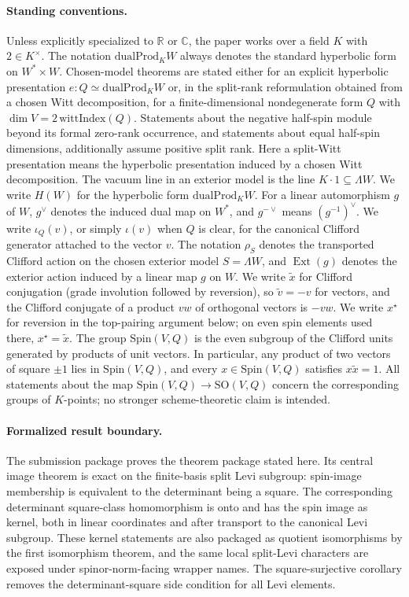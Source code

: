 \documentclass{birkjour}
\theoremstyle{plain}
\theoremstyle{definition}
\theoremstyle{remark}
\newcommand{\Spin}{\mathrm{Spin}}
\newcommand{\SO}{\mathrm{SO}}
\newcommand{\dualProd}{\mathrm{dualProd}}
\newcommand{\ExtMap}{\operatorname{Ext}}
\newcommand{\wedgeW}{\Lambda W}
\begin{document}
\paragraph{Standing conventions.}
Unless explicitly specialized to $\mathbb{R}$ or $\mathbb{C}$, the paper works
over a field $K$ with $2\in K^\times$. The notation $\dualProd_K W$ always
denotes the standard hyperbolic form on $W^* \times W$. Chosen-model theorems
are stated either for an explicit hyperbolic presentation
$e:Q \simeq \dualProd_K W$ or, in the split-rank reformulation obtained from a
chosen Witt decomposition, for a
finite-dimensional nondegenerate form $Q$ with
$\dim V = 2\,\mathrm{wittIndex}(Q)$. Statements about the negative half-spin
module beyond its formal zero-rank occurrence, and statements about equal
half-spin dimensions, additionally assume positive split rank.
Here a split-Witt presentation means the hyperbolic presentation induced by a
chosen Witt decomposition. The vacuum line in an exterior model is the line
$K\cdot 1\subseteq \wedgeW$.
We write $H(W)$ for the hyperbolic form $\dualProd_K W$. For a linear
automorphism $g$ of $W$, $g^\vee$ denotes the induced dual map on $W^*$, and
$g^{-\vee}$ means $(g^{-1})^\vee$. We write $\iota_Q(v)$, or simply
$\iota(v)$ when $Q$ is clear, for the canonical Clifford generator attached to
the vector $v$. The notation $\rho_S$ denotes the transported Clifford action
on the chosen exterior model $S=\wedgeW$, and $\ExtMap(g)$ denotes the
exterior action induced by a linear map $g$ on $W$.
We write $\tilde x$ for Clifford conjugation (grade involution followed by
reversion), so $\tilde v=-v$ for vectors, and the Clifford conjugate of a
product \(vw\) of orthogonal vectors is \(-vw\). We write $x^\star$ for reversion in the top-pairing
argument below; on even spin elements used there, $x^\star=\tilde x$. The group
$\Spin(V,Q)$ is the even subgroup of the Clifford units generated by products of
unit vectors. In particular, any product of two vectors of square $\pm1$ lies in
$\Spin(V,Q)$, and every $x\in \Spin(V,Q)$ satisfies $x\tilde x=1$.
All statements about the map $\Spin(V,Q)\to\SO(V,Q)$ concern the corresponding
groups of $K$-points; no stronger scheme-theoretic claim is intended.

\paragraph{Formalized result boundary.}
The submission package proves the theorem package stated here. Its central image
theorem is exact on the finite-basis split Levi subgroup: spin-image membership
is equivalent to the determinant being a square. The corresponding determinant
square-class homomorphism is onto and has the spin image as kernel, both in
linear coordinates and after transport to the canonical Levi subgroup. These
kernel statements are also packaged as quotient isomorphisms by the first
isomorphism theorem, and the same local split-Levi characters are exposed under
spinor-norm-facing wrapper names. The square-surjective corollary removes the
determinant-square side condition for all Levi elements.
\end{document}
